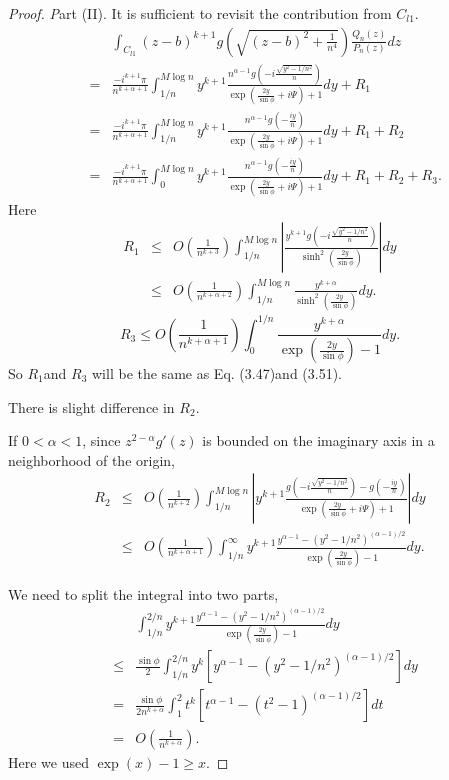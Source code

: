 \documentclass[11pt]{article}
\begin{document}
\begin{proof}
    {\textit Part (II).} It is sufficient to revisit the contribution from $C_{l1}$.
    \begin{eqnarray}
    &&\int_{C_{l1}} (z-b)^{k+1} g(\sqrt{(z-b)^2+\frac{1}{n^4}}) \frac{Q_n(z)}{P_n(z)} dz\nonumber\\
    &=& \frac{-i^{k+1}\pi}{ n^{k+\alpha+1}}\int_{1/n}^{M\log n} y^{k+1} \frac{  n^{\alpha-1} g(-i\frac{\sqrt{y^2-1/n^2}}{n}) }{\exp\left(\frac{2y}{\sin\phi}+i\Psi\right) + 1} dy + R_1\\
    &=& \frac{-i^{k+1}\pi}{ n^{k+\alpha+1}}\int_{1/n}^{M\log n}  y^{k+1}\frac{ n^{\alpha-1} g(-\frac{iy}{n}) }{\exp\left(\frac{2y}{\sin\phi}+i\Psi\right) + 1} dy + R_1 + R_2\\
    &=& \frac{ -i^{k+1} \pi}{ n^{k+\alpha+1}}\int_{0}^{M\log n}  y^{k+1}\frac{ n^{\alpha-1} g(-\frac{iy}{n}) }{\exp\left(\frac{2y}{\sin\phi}+i\Psi\right) + 1} dy + R_1 + R_2 +R_3.
\end{eqnarray}
Here
\begin{eqnarray}
    R_1 &\leq & O(\frac{1}{ n^{k+3}})\int_{1/n}^{M\log n}  \left|\frac{ y^{k+1} g(-i\frac{\sqrt{y^2-1/n^2}}{n}) }{\sinh^2\left(\frac{2y}{\sin\phi}\right)}  \right| dy \\
    &\leq& O(\frac{1}{ n^{k+\alpha+2}})\int_{1/n}^{M\log n}  \frac{ y^{k+\alpha} }{\sinh^2\left(\frac{2y}{\sin\phi}\right)} dy.
\end{eqnarray}
\begin{equation}
    R_3 \leq O(\frac{1}{ n^{k+\alpha+1}})\int_{0}^{1/n} \frac{ y^{k+\alpha} }{\exp\left(\frac{2y}{\sin\phi}\right) - 1} dy.
\end{equation}
So $R_1$and $R_3$ will be the same as Eq. (3.47)and (3.51).

There is slight difference in $R_2$.

If $0<\alpha<1$, since $z^{2-\alpha} g'(z)$ is bounded on the imaginary axis in a neighborhood of the origin, 
\begin{eqnarray}
    R_2& \leq &O(\frac{1}{ n^{k+2}})\int_{1/n}^{M\log n}  \left|y^{k+1}\frac{  g(-i\frac{\sqrt{y^2-1/n^2}}{n}) - g(-\frac{iy}{n})}{\exp\left(\frac{2y}{\sin\phi}+i\Psi\right) + 1} \right|dy \\
    &\leq & O(\frac{1}{ n^{k+\alpha+1}})\int_{1/n}^{\infty}  y^{k+1}\frac{  y^{\alpha-1} - (y^2-1/n^2)^{(\alpha-1)/2} }{\exp\left(\frac{2y}{\sin\phi}\right) - 1} dy.
\end{eqnarray}

We need to split the integral into two parts,
\begin{eqnarray}
    &&\int_{1/n}^{2/n}  y^{k+1}\frac{  y^{\alpha-1} - (y^2-1/n^2)^{(\alpha-1)/2} }{\exp\left(\frac{2y}{\sin\phi}\right) - 1} dy \nonumber\\
    &\leq& \frac{\sin \phi}{2} \int_{1/n}^{2/n}  y^{k}\left[  y^{\alpha-1} - (y^2-1/n^2)^{(\alpha-1)/2}\right]  dy\\
    &=& \frac{\sin \phi}{2 n^{k+\alpha}} \int_{1}^{2}  t^{k}\left[  t^{\alpha-1} - (t^2-1)^{(\alpha-1)/2}\right]  dt\\
    &=& O(\frac{1}{n^{k+\alpha}}).
\end{eqnarray}
Here we used $\exp(x)-1\geq x$.


\end{proof}
\end{document}
